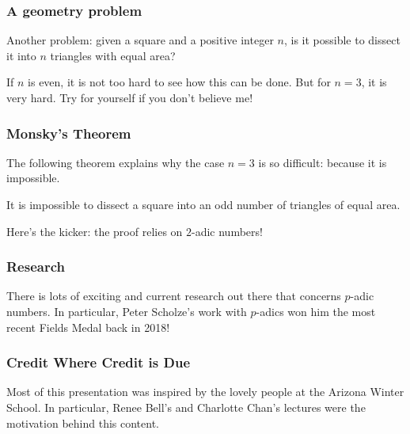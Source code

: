 \documentclass[10pt]{beamer}
\begin{document}
\begin{frame}
    \frametitle{A geometry problem}
    
    Another problem: given a square and a positive integer $n$, is it possible to dissect it into $n$ triangles with equal area?
    
    If $n$ is even, it is not too hard to see how this can be done. But for $n=3$, it is very hard. Try for yourself if you don't believe me!
\end{frame}

\begin{frame}
    \frametitle{Monsky's Theorem}
    
    The following theorem explains why the case $n=3$ is so difficult: because it is impossible.
    \begin{theorem}[Monsky]
        It is impossible to dissect a square into an odd number of triangles of equal area.
    \end{theorem}
    Here's the kicker: the proof relies on $2$-adic numbers!
\end{frame}

\begin{frame}
    \frametitle{Research}

    There is lots of exciting and current research out there that concerns \(p\)-adic numbers.
    In particular, Peter Scholze's work with \(p\)-adics won him the most recent Fields Medal back in 2018!

\end{frame}

\begin{frame}
    \frametitle{Credit Where Credit is Due}

    Most of this presentation was inspired by the lovely people at the Arizona Winter School.
    In particular, Renee Bell's and Charlotte Chan's lectures were the motivation behind this content.

\end{frame}
\end{document}

